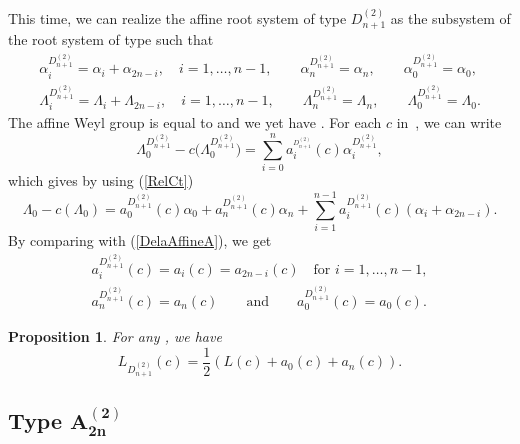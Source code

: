 \documentclass[10pt,a4paper]{amsart}
\newtheorem{Proposition}[Theorem]{Proposition}
 { \theoremstyle{definition}
\newtheorem{Definition}[Theorem]{Definition}
\newtheorem{Note}[Theorem]{Note}
\newtheorem{Example}[Theorem]{Example}
\newtheorem{Remark}[Theorem]{Remark} }
\numberwithin{equation}{section}
\begin{document}
\label{sucsecD^2}This time, we can realize the affine root system of type $%
D_{n+1}^{(2)}$ as the subsystem of the root system of type 
such that
\begin{gather}
\alpha _{i}^{D_{n+1}^{(2)}}=\alpha _{i}+\alpha _{2n-i},\quad i=1,\dots ,n-1 ,\qquad
\alpha _{n}^{D_{n+1}^{(2)}}=\alpha _{n} ,\qquad
\alpha _{0}^{D_{n+1}^{(2)}}=\alpha _{0},\nonumber
\\
\Lambda _{i}^{D_{n+1}^{(2)}}=\Lambda _{i}+\Lambda _{2n-i},\quad i=1,\dots ,n-1 ,\qquad
\Lambda _{n}^{D_{n+1}^{(2)}}=\Lambda _{n}, \qquad
\Lambda _{0}^{D_{n+1}^{(2)}}=\Lambda _{0}.
 \label{RelCt}
\end{gather}
The affine Weyl group  is equal to 
and we yet have .
For each $c$ in~, we can write
\begin{equation*}
\Lambda _{0}^{D_{n+1}^{(2)}}-c\bigl(\Lambda
_{0}^{D_{n+1}^{(2)}}\bigr)=\sum_{i=0}^{n}a_{i}^{_{D_{n+1}^{(2)}}}(c)\alpha
_{i}^{D_{n+1}^{(2)}},
\end{equation*}%
which gives by using (\ref{RelCt})%
\begin{equation*}
\Lambda _{0}-c(\Lambda _{0})=a_{0}^{D_{n+1}^{(2)}}(c)\alpha
_{0}+a_{n}^{D_{n+1}^{(2)}}(c)\alpha
_{n}+\sum_{i=1}^{n-1}a_{i}^{D_{n+1}^{(2)}}(c)(\alpha _{i}+\alpha _{2n-i}).
\end{equation*}
By comparing with (\ref{DelaAffineA}), we get
\begin{gather}
a_{i}^{D_{n+1}^{(2)}}(c)=a_{i}(c)=a_{2n-i}(c)\quad \text{for }i=1,\dots ,n-1 ,\nonumber\\
a_{n}^{D_{n+1}^{(2)}}(c)=a_{n}(c)\qquad \text{and}\qquad
a_{0}^{D_{n+1}^{(2)}}(c)=a_{0}(c).
\label{A_i(Dn+1,2)}
\end{gather}

\begin{Proposition}
	\label{Prop_D(n+1,2)}For any , we have
	\begin{equation*}
	L_{D_{n+1}^{(2)}}(c)=\frac{1}{2}(L(c)+a_{0}(c)+a_{n}(c)).
	\end{equation*}
\end{Proposition}

\subsection[Type A\_\{2n\}\^{}(2)]{Type $\boldsymbol{A_{2n}^{(2)}}$}
\label{subsecA(2n,2)}
\end{document}
